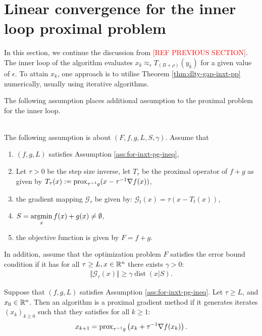 \documentclass[12pt]{article}
\DeclareMathOperator{\dist}{\mathop{dist}}
\begin{document}
\section{Linear convergence for the inner loop proximal problem}
    In this section, we continue the discussion from \textcolor{red}{[REF PREVIOUS SECTION]}. 
    The inner loop of the algorithm evaluates $x_k \approx_\epsilon T_{(B + \rho)}(y_k)$ for a given value of $\epsilon$. 
    To attain $x_k$, one approach is to utilise Theorem \ref{thm:dlty-gap-inxt-pp} numerically, usually using iterative algorithms. 
    \par
    The following assumption places additional assumption to the proximal problem for the inner loop. 
    \begin{assumption}\;\label{ass:pg-eb}\\
        The following assumption is about $(F, f, g, L, S, \gamma)$. 
        Assume that
        \begin{enumerate}[nosep]
            \item $(f, g, L)$ satisfies Assumption \ref{ass:for-inxt-pg-ineq}, 
            \item Let $\tau > 0$ be the step size inverse, let $T_{\tau}$ be the proximal operator of $f + g$ as given by $T_{\tau}(x) := \operatorname{prox}_{\tau^{-1}g}(x - \tau^{-1}\nabla f(x))$, 
            \item the gradient mapping $\mathcal G_{\tau}$ be given by: $\mathcal G_t(x) = \tau (x - T_t(x))$, 
            \item $S= \mathop{\rm argmin}\limits_{x}{f(x) + g(x)} \neq \emptyset$, 
            \item the objective function is given by $F = f + g$. 
        \end{enumerate}        
        In addition, assume that the optimization problem $F$ satisfies the error bound condition if it has for all $\tau \ge L, x \in \mathbb R^n$ there exists $\gamma > 0$: 
        \begin{align*}
            \Vert \mathcal G_\tau(x)\Vert \ge \gamma\dist(x|S). 
        \end{align*}
    \end{assumption}
    \begin{definition}\label{def:ista}
        Suppose that $(f, g, L)$ satisfies Assumption \ref{ass:for-inxt-pg-ineq}. 
        Let $\tau \ge L$, and $x_0 \in \mathbb R^n$. 
        Then an algorithm is a proximal gradient method if it generates iterates $(x_k)_{k \ge 0}$ such that they satisfies for all $k \ge 1$: 
        \begin{align*}
            x_{k + 1} = \operatorname{prox}_{\tau^{-1} g}\left(x_k + \tau^{-1}\nabla f(x_k)\right). 
        \end{align*}
    \end{definition}
\end{document}
